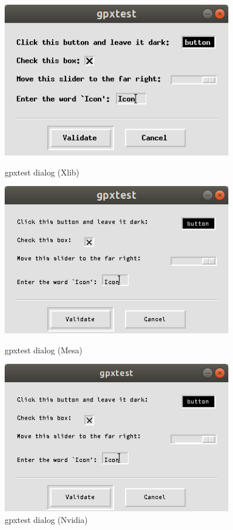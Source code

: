 \documentclass[letterpaper,12pt]{article}
\begin{document}
\begin{figure}[h!]
  \centering
  \begin{minipage}{0.33\textwidth}
    \centering
    \includegraphics[width=0.9\textwidth]{gpxtest-dialog-x11.png}
    \caption{gpxtest dialog (Xlib)}
  \end{minipage}\hfill
  \begin{minipage}{0.33\textwidth}
    \centering
    \includegraphics[width=0.9\textwidth]{gpxtest-dialog-ogl.png}
    \caption{gpxtest dialog (Mesa)}
  \end{minipage}\hfill
  \begin{minipage}{0.33\textwidth}
    \centering
    \includegraphics[width=0.9\textwidth]{gpxtest-dialog-ogl-nvidia.png}
    \caption{gpxtest dialog (Nvidia)}
  \end{minipage}\hfill
\end{figure}
\end{document}
